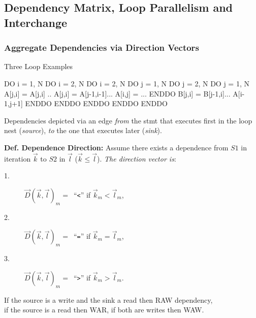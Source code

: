 \documentclass{beamer}
\newcommand{\emp}[1]{\textcolor{DikuRed}{ #1}}
\begin{document}
\subsection{Dependency Matrix, Loop Parallelism and Interchange}
\begin{frame}[fragile,t]
  \frametitle{Aggregate Dependencies via Direction Vectors} %

\begin{block}{Three Loop Examples}
\begin{colorcode}
DO i = 1, N            DO i = 2, N               DO i = 2, N
 DO j = 1, N            DO j = 2, N               DO j = 1, N 
   A[j,i] = A[j,i] ..     A[j,i] = A[j-1,i-1]...   A[i,j] = ...
 ENDDO                    B[j,i] = B[j-1,i]...       A[i-1,j+1]
ENDDO                  ENDDO ENDDO               ENDDO ENDDO
\end{colorcode}
\end{block} 

\smallskip

Dependencies depicted via an edge {\em from} the stmt that executes first
in the loop nest ({\em source}), {\em to} the one that executes later ({\em sink}).

\smallskip

{\bf Def. Dependence Direction:} Assume there exists a dependence from $S1$
in iteration $\vec{k}$ to $S2$ in $\vec{l}$ ($\vec{k}\leq\vec{l}$). 
\emp{\em The direction vector is}:
\begin{description}
    \item[1.] $\vec{D}(\vec{k},\vec{l})_m = $~``{\tt{}<}'' if $\vec{k}_m < \vec{l}_m$,
    \item[2.] $\vec{D}(\vec{k},\vec{l})_m = $~``{\tt{}=}'' if $\vec{k}_m = \vec{l}_m$,
    \item[3.] $\vec{D}(\vec{k},\vec{l})_m = $~``{\tt{}>}'' if $\vec{k}_m > \vec{l}_m$.
\end{description}

\medskip
If the source is a write and the sink a read then RAW dependency,\\
if the source is a read then WAR, if both are writes then WAW.  
\end{frame}
\end{document}
